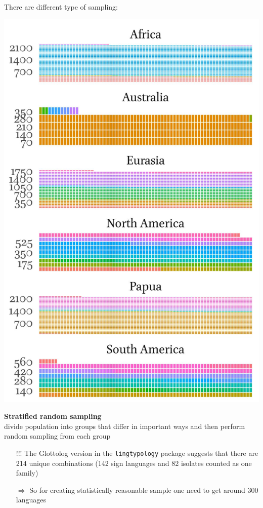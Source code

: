 \documentclass[13pt, t]{beamer}
\begin{document}
\begin{frame}{There are different type of sampling:}
\begin{multicols}{2}
\includegraphics[width=\linewidth]{images/05_families_by_area}
\columnbreak

\textbf{Stratified random sampling}\\
divide population into groups that differ in important ways and then perform random sampling from each group\pause\\
\begin{itemize}
\item[\color{colorblue}!!!] The Glottolog version in the \texttt{\small lingtypology} package suggests that there are \\ \alert{214 unique combinations} (142 sign languages and 82 isolates counted as one family) \pause
\item[\color{colorblue}$\Rightarrow$] So for creating statistically reasonable sample one need to get around 300 languages
\end{itemize}
\end{multicols}
\end{frame}
\end{document}
